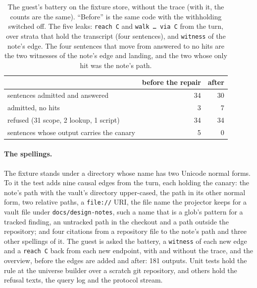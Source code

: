 \documentclass[11pt]{article}
\theoremstyle{plain}
\theoremstyle{definition}
\theoremstyle{remark}
\begin{document}
\begin{table}[h]
\centering
\begin{tabular}{lrr}
\toprule
& before the repair & after \\
\midrule
sentences admitted and answered & 34 & 30 \\
admitted, no hits & 3 & 7 \\
refused (31 scope, 2 lookup, 1 script) & 34 & 34 \\
sentences whose output carries the canary & 5 & 0 \\
\bottomrule
\end{tabular}
\caption{The guest's battery on the fixture store, without the trace (with it, the counts are the
same). ``Before'' is the same code with the withholding switched off. The five leaks:
\texttt{reach C} and \texttt{walk \dots\ via C} from the turn, over strata that hold the
transcript (four sentences), and \texttt{witness} of the note's edge. The four sentences that
move from answered to no hits are the two witnesses of the note's edge and landing, and the two
whose only hit was the note's path.}\label{tab:battery}
\end{table}

\paragraph{The spellings.}
The fixture stands under a directory whose name has two Unicode normal forms. To it the test adds
nine causal edges from the turn, each holding the canary: the note's path with the vault's
directory upper-cased, the path in its other normal form, two relative paths, a \texttt{file://}
URI, the file name the projector keeps for a vault file under \texttt{docs/design-notes}, such a
name that is a glob's pattern for a tracked finding, an untracked path in the checkout and a path
outside the repository; and four citations from a repository file to the note's path and three
other spellings of it. The guest is asked the battery, a \texttt{witness} of each new edge and a
\texttt{reach C} back from each new endpoint, with and without the trace, and the overview, before
the edges are added and after: 181 outputs. Unit tests hold the rule at the universe builder over
a scratch git repository, and others hold the refusal texts, the query log and the protocol
stream.
\end{document}
